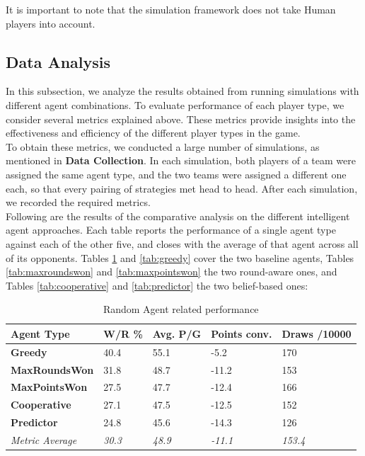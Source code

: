 \documentclass[sigconf]{acmart}
\begin{document}
\noindent It is important to note that the simulation framework does not take Human players into account.

\subsection{Data Analysis}

In this subsection, we analyze the results obtained from running simulations with different agent combinations. To evaluate performance of each player type, we consider several metrics explained above. These metrics provide insights into the effectiveness and efficiency of the different player types in the game.\\

\noindent To obtain these metrics, we conducted a large number of simulations, as mentioned in \textbf{Data Collection}. In each simulation, both players of a team were assigned the same agent type, and the two teams were assigned a different one each, so that every pairing of strategies met head to head. After each simulation, we recorded the required metrics.\\

\noindent Following are the results of the comparative analysis on the different intelligent agent approaches. Each table reports the performance of a single agent type against each of the other five, and closes with the average of that agent across all of its opponents. Tables \ref{tab:random} and \ref{tab:greedy} cover the two baseline agents, Tables \ref{tab:maxroundswon} and \ref{tab:maxpointswon} the two round-aware ones, and Tables \ref{tab:cooperative} and \ref{tab:predictor} the two belief-based ones:\\

\begin{table}[H]
  \fontsize{11}{13}\selectfont %
  \begin{tabular}{@{}p{2.9cm}p{1cm}p{1cm}p{1.2cm}p{1.2cm}@{}}
    \toprule
    Agent Type & \textbf{W/R \%} & \textbf{Avg. P/G} & \textbf{Points conv.} & \textbf{Draws /10000}\\
    \midrule
    \textbf{Greedy} & 40.4 & 55.1 & -5.2 & 170\\
    \textbf{MaxRoundsWon} & 31.8 & 48.7 & -11.2 & 153\\
    \textbf{MaxPointsWon} & 27.5 & 47.7 & -12.4 & 166\\
    \textbf{Cooperative} & 27.1 & 47.5 & -12.5 & 152\\
    \textbf{Predictor} & 24.8 & 45.6 & -14.3 & 126\\
    \midrule
    \textit{Metric Average} & \textit{30.3} & \textit{48.9} & \textit{-11.1} & \textit{153.4}\\
    \bottomrule
  \end{tabular}
  \vspace{2mm} %
  \caption{Random Agent related performance}
  \label{tab:random}
\end{table}
\end{document}
